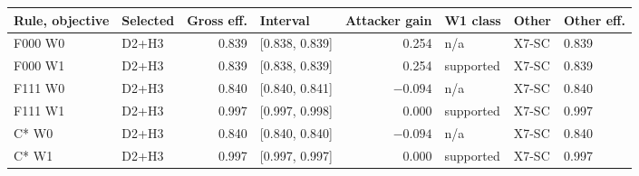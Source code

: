 \begin{tabular}{@{}llrlrlll@{}}\toprule
Rule, objective & Selected & Gross eff. & Interval & Attacker gain & W1 class & Other & Other eff. \\\midrule
F000 W0 & D2+H3 & 0.839 & [0.838, 0.839] & 0.254 & n/a & X7-SC & 0.839 \\
F000 W1 & D2+H3 & 0.839 & [0.838, 0.839] & 0.254 & supported & X7-SC & 0.839 \\
F111 W0 & D2+H3 & 0.840 & [0.840, 0.841] & \ensuremath{-0.094} & n/a & X7-SC & 0.840 \\
F111 W1 & D2+H3 & 0.997 & [0.997, 0.998] & 0.000 & supported & X7-SC & 0.997 \\
C* W0 & D2+H3 & 0.840 & [0.840, 0.840] & \ensuremath{-0.094} & n/a & X7-SC & 0.840 \\
C* W1 & D2+H3 & 0.997 & [0.997, 0.997] & 0.000 & supported & X7-SC & 0.997 \\
\bottomrule\end{tabular}

